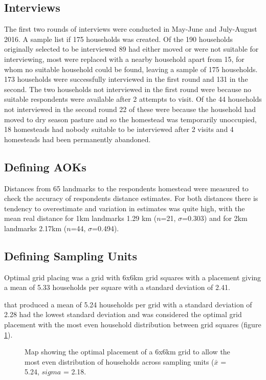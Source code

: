 \subsection{Interviews}
The first two rounds of interviews were conducted in May-June and July-August 2016. A sample list if 175 households was created. Of the 190 households originally selected to be interviewed 89 had either moved or were not suitable for interviewing, most were replaced with a nearby household apart from 15, for whom no suitable household could be found, leaving a sample of 175 households. 173 households were successfully interviewed in the first round and 131 in the second. The two households not interviewed in the first round were because no suitable respondents were available after 2 attempts to visit. Of the 44 households not interviewed in the second round 22 of these were because the household had moved to dry season pasture and so the homestead was temporarily unoccupied, 18 homesteads had nobody suitable to be interviewed after 2 visits and 4 homesteads had been permanently abandoned.

\subsection{Defining AOKs}
Distances from 65 landmarks to the respondents homestead were measured to check the accuracy of respondents distance estimates. For both distances there is tendency to overestimate and variation in estimates was quite high, with the mean real distance for 1km landmarks 1.29 km ($n$=21, $\sigma$=0.303) and for 2km landmarks 2.17km ($n$=44, $\sigma$=0.494).

\subsection{Defining Sampling Units}

Optimal grid placing was a grid with 6x6km grid squares with a placement giving a mean of 5.33 households per square with a standard deviation of 2.41.

that produced a mean of 5.24 households per grid with a standard deviation of 2.28 had the lowest standard deviation and was considered the optimal grid placement with the most even household distribution between grid squares (figure \ref{fig:6km_grid_place}).

\begin{figure}[h]
\centering
\setlength\fboxsep{0pt}
\setlength\fboxrule{0.5pt}
\caption{Map showing the optimal placement of a 6x6km grid to allow the most even distribution of households across sampling units ($\bar{x}$ = 5.24, $sigma$ = 2.18.}
\label{fig:6km_grid_place}
\end{figure}
 
